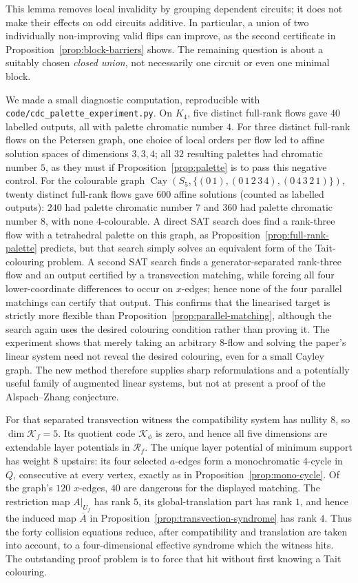 \documentclass[11pt,a4paper]{article}
\theoremstyle{definition}
\theoremstyle{remark}
\newcommand{\Cay}{\operatorname{Cay}}
\begin{document}
This lemma removes local invalidity by grouping dependent circuits; it does not make their effects on odd circuits additive.  In particular, a union of two individually non-improving valid flips can improve, as the second certificate in Proposition~\ref{prop:block-barriers} shows.  The remaining question is about a suitably chosen \emph{closed union}, not necessarily one circuit or even one minimal block.

We made a small diagnostic computation, reproducible with \nolinkurl{code/cdc_palette_experiment.py}.  On $K_4$, five distinct full-rank flows gave $40$ labelled outputs, all with palette chromatic number $4$.  For three distinct full-rank flows on the Petersen graph, one choice of local orders per flow led to affine solution spaces of dimensions $3,3,4$; all $32$ resulting palettes had chromatic number $5$, as they must if Proposition~\ref{prop:palette} is to pass this negative control.  For the colourable graph $\Cay(S_5,\{(0\,1),(0\,1\,2\,3\,4),(0\,4\,3\,2\,1)\})$, twenty distinct full-rank flows gave $600$ affine solutions (counted as labelled outputs): $240$ had palette chromatic number $7$ and $360$ had palette chromatic number $8$, with none $4$-colourable.  A direct SAT search does find a rank-three flow with a tetrahedral palette on this graph, as Proposition~\ref{prop:full-rank-palette} predicts, but that search simply solves an equivalent form of the Tait-colouring problem.  A second SAT search finds a generator-separated rank-three flow and an output certified by a transvection matching, while forcing all four lower-coordinate differences to occur on $x$-edges; hence none of the four parallel matchings can certify that output.  This confirms that the linearised target is strictly more flexible than Proposition~\ref{prop:parallel-matching}, although the search again uses the desired colouring condition rather than proving it.  The experiment shows that merely taking an arbitrary $8$-flow and solving the paper's linear system need not reveal the desired colouring, even for a small Cayley graph.  The new method therefore supplies sharp reformulations and a potentially useful family of augmented linear systems, but not at present a proof of the Alspach--Zhang conjecture.

For that separated transvection witness the compatibility system has nullity $8$, so $\dim\mathcal K_f=5$.  Its quotient code $\mathcal K_\phi$ is zero, and hence all five dimensions are extendable layer potentials in $\mathcal R_f$.  The unique layer potential of minimum support has weight $8$ upstairs: its four selected $a$-edges form a monochromatic $4$-cycle in $Q$, consecutive at every vertex, exactly as in Proposition~\ref{prop:mono-cycle}.  Of the graph's $120$ $x$-edges, $40$ are dangerous for the displayed matching.  The restriction map $A|_{U_f}$ has rank $5$, its global-translation part has rank $1$, and hence the induced map $\overline A$ in Proposition~\ref{prop:transvection-syndrome} has rank $4$.  Thus the forty collision equations reduce, after compatibility and translation are taken into account, to a four-dimensional effective syndrome which the witness hits.  The outstanding proof problem is to force that hit without first knowing a Tait colouring.
\end{document}
